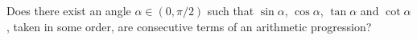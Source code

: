 Does there exist an angle $ \alpha\in(0,\pi/2)$ such that $ \sin\alpha$,  $ \cos\alpha$,  $ \tan\alpha$ and $ \cot\alpha$,  taken in some order, are consecutive terms of an arithmetic progression?